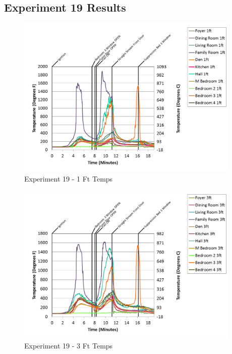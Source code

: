 \documentclass{article}
\begin{document}
\begin{appendices}
\clearpage
\clearpage		\large
\subsection{Experiment 19 Results} \label{App:Exp19Results} 

\begin{figure}[h!]
	\centering
	\includegraphics[height=3.05in]{0_Images/Results_Charts/Exp_19_Charts/1FtTemps.png}
	\caption{Experiment 19 - 1 Ft Temps}
\end{figure}


\begin{figure}[h!]
	\centering
	\includegraphics[height=3.05in]{0_Images/Results_Charts/Exp_19_Charts/3FtTemps.png}
	\caption{Experiment 19 - 3 Ft Temps}
\end{figure}

\clearpage


\end{appendices}
\end{document}
